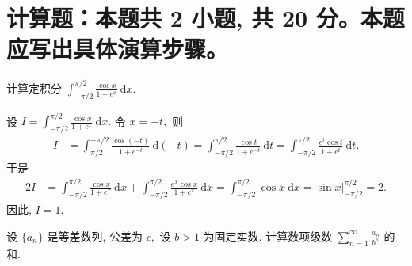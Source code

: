 \showquestionpoints

\section{计算题：本题共 2 小题, 共 20 分。本题应写出具体演算步骤。}


\begin{question}[points = 10]
计算定积分 $\displaystyle \int_{-\pi/2}^{\pi/2} \frac{\cos x}{1+e^x} ~ \mathrm{d}x.$

\end{question}

\begin{solution}
设 $\displaystyle I = \int_{-\pi/2}^{\pi/2} \frac{\cos x}{1+e^x} ~ \mathrm{d}x.$ 令 $x = -t,$ 则
\begin{align*}
I & = \int_{\pi/2}^{-\pi/2} \frac{\cos (-t)}{1+e^{-t}} ~ \mathrm{d}(-t) = \int_{-\pi/2}^{\pi/2} \frac{\cos t}{1+e^{-t}} ~ \mathrm{d}t = \int_{-\pi/2}^{\pi/2} \frac{e^t \cos t}{1+e^t} ~ \mathrm{d}t.
\end{align*}
于是
\begin{align*}
2I & = \int_{-\pi/2}^{\pi/2} \frac{\cos x}{1+e^x} ~ \mathrm{d}x + \int_{-\pi/2}^{\pi/2} \frac{e^x \cos x}{1+e^x} ~ \mathrm{d}x = \int_{-\pi/2}^{\pi/2} \cos x ~ \mathrm{d}x = \sin x \bigg|_{-\pi/2}^{\pi/2} = 2.
\end{align*}
因此, $I = 1.$
\end{solution}

\begin{question}[points = 10]
设 $\{ a_n \}$ 是等差数列, 公差为 $c,$ 设 $b > 1$ 为固定实数. 计算数项级数 $\displaystyle \sum_{n=1}^\infty \frac{a_n}{b^n}$ 的和.

\end{question}

